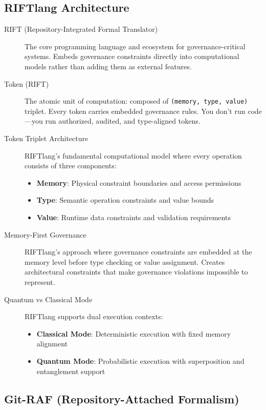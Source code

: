 \subsection*{RIFTlang Architecture}

\begin{description}
\item[RIFT (Repository-Integrated Formal Translator)] The core programming language and ecosystem for governance-critical systems. Embeds governance constraints directly into computational models rather than adding them as external features.

\item[Token (RIFT)] The atomic unit of computation: composed of \texttt{(memory, type, value)} triplet. Every token carries embedded governance rules. You don't run code—you run authorized, audited, and type-aligned tokens.

\item[Token Triplet Architecture] RIFTlang's fundamental computational model where every operation consists of three components:
\begin{itemize}
\item \textbf{Memory}: Physical constraint boundaries and access permissions
\item \textbf{Type}: Semantic operation constraints and value bounds  
\item \textbf{Value}: Runtime data constraints and validation requirements
\end{itemize}

\item[Memory-First Governance] RIFTlang's approach where governance constraints are embedded at the memory level before type checking or value assignment. Creates architectural constraints that make governance violations impossible to represent.

\item[Quantum vs Classical Mode] RIFTlang supports dual execution contexts:
\begin{itemize}
\item \textbf{Classical Mode}: Deterministic execution with fixed memory alignment
\item \textbf{Quantum Mode}: Probabilistic execution with superposition and entanglement support
\end{itemize}
\end{description}

\subsection*{Git-RAF (Repository-Attached Formalism)}

